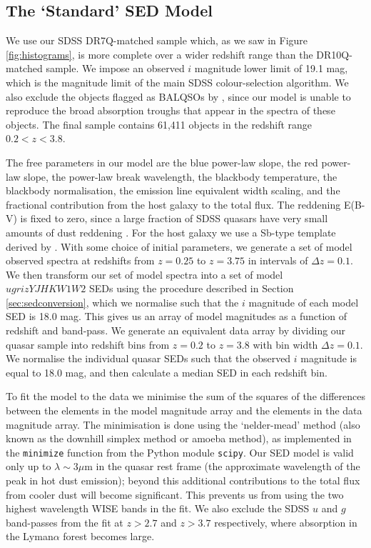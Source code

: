 \subsection{The `Standard' SED Model} 

We use our SDSS DR7Q-matched sample which, as we saw in Figure \ref{fig:histograms}, is more complete over a wider redshift range than the DR10Q-matched sample. We impose an observed $i$ magnitude lower limit of 19.1 mag, which is the magnitude limit of the main SDSS colour-selection algorithm. We also exclude the objects flagged as BALQSOs by \citet{shen11}, since our model is unable to reproduce the broad absorption troughs that appear in the spectra of these objects. The final sample contains 61,411 objects in the redshift range $0.2 < z < 3.8$. 

The free parameters in our model are the blue power-law slope, the red power-law slope, the power-law break wavelength, the blackbody temperature, the blackbody normalisation, the emission line equivalent width scaling, and the fractional contribution from the host galaxy to the total flux. The reddening E(B-V) is fixed to zero, since a large fraction of SDSS quasars have very small amounts of dust reddening \citep{richards03}. For the host galaxy we use a Sb-type template derived by \citet{mannucci01}. With some choice of initial parameters, we generate a set of model observed spectra at redshifts from $z=0.25$ to $z=3.75$ in intervals of $\Delta z = 0.1$. We then transform our set of model spectra into a set of model $ugrizYJHKW1W2$ SEDs using the procedure described in Section \ref{sec:sedconversion}, which we normalise such that the $i$ magnitude of each model SED is 18.0 mag. This gives us an array of model magnitudes as a function of redshift and band-pass. We generate an equivalent data array by dividing our quasar sample into redshift bins from $z=0.2$ to $z=3.8$ with bin width $\Delta z = 0.1$. We normalise the individual quasar SEDs such that the observed $i$ magnitude is equal to 18.0 mag, and then calculate a median SED in each redshift bin. 

To fit the model to the data we minimise the sum of the squares of the differences between the elements in the model magnitude array and the elements in the data magnitude array. The minimisation is done using the `nelder-mead' method (also known as the downhill simplex method or amoeba method), as implemented in the {\tt minimize} function from the Python module {\tt scipy}. Our SED model is valid only up to $\lambda \sim 3\mu$m in the quasar rest frame (the approximate wavelength of the peak in hot dust emission); beyond this additional contributions to the total flux from cooler dust will become significant. This prevents us from using the two highest wavelength WISE bands in the fit. We also exclude the SDSS $u$ and $g$ band-passes from the fit at $z > 2.7$ and $z > 3.7$ respectively, where absorption in the Lyman$\alpha$ forest becomes large. 

